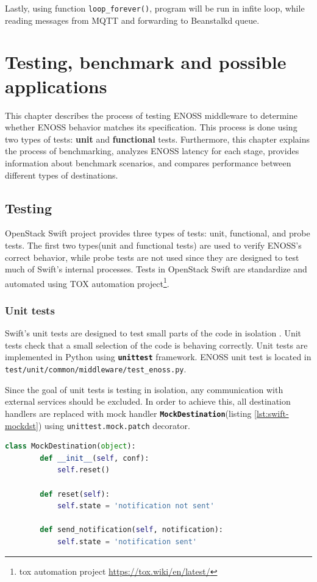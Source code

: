     Lastly, using function \texttt{loop\_forever()}, program will be run in infite loop, while reading messages from MQTT and forwarding to Beanstalkd queue.


\chapter{Testing, benchmark and possible applications}\label{chap:testing}
    This chapter describes the process of testing ENOSS middleware to determine whether ENOSS behavior matches its specification. This process is done using two types of tests: \textbf{unit} and \textbf{functional} tests. Furthermore, this chapter explains the process of benchmarking, analyzes ENOSS latency for each stage, provides information about benchmark scenarios, and compares performance between different types of destinations.

\section{Testing}
    OpenStack Swift project provides three types of tests: unit, functional, and probe tests. The first two types(unit and functional tests) are used to verify ENOSS's correct behavior, while probe tests are not used since they are designed to test much of Swift's internal processes.
    Tests in OpenStack Swift are standardize and automated using TOX automation project\footnote{tox automation project {\url{https://tox.wiki/en/latest/}}}.

    \subsection{Unit tests}
    Swift's unit tests are designed to test small parts of the code in isolation \cite{swiftContributing123}. Unit tests check that a small selection of the code is behaving correctly. Unit tests are implemented in Python using \textbf{\texttt{unittest}} framework. ENOSS unit test is located in \texttt{test/unit/common/middleware/test\_enoss.py}.

    Since the goal of unit tests is testing in isolation, any communication with external services should be excluded. In order to achieve this, all destination handlers are replaced with mock handler \textbf{\texttt{MockDestination}}(listing \ref{lst:swift-mockdst}) using \texttt{unittest.mock.patch} decorator.

    \begin{lstlisting}[language=Python, style=pythonStyle, caption=Mock class used to replace destination handlers in unit tests., label=lst:swift-mockdst]
    class MockDestination(object):
        def __init__(self, conf):
            self.reset()

        def reset(self):
            self.state = 'notification not sent'

        def send_notification(self, notification):
            self.state = 'notification sent'
    \end{lstlisting}

